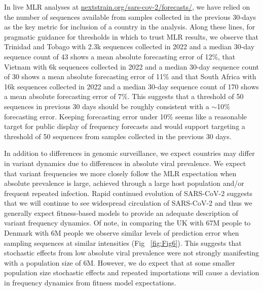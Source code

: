 \documentclass[10pt,letterpaper]{article}
\begin{document}
In live MLR analyses at \href{https://nextstrain.org/sars-cov-2/forecasts/}{nextstrain.org/sars-cov-2/forecasts/}, we have relied on the number of sequences available from samples collected in the previous 30-days as the key metric for inclusion of a country in the analysis.
Along these lines, for pragmatic guidance for thresholds in which to trust MLR results, we observe that Trinidad and Tobago with 2.3k sequences collected in 2022 and a median 30-day sequence count of 43 shows a mean absolute forecasting error of 12\%, that Vietnam with 6k sequences collected in 2022 and a median 30-day sequence count of 30 shows a mean absolute forecasting error of 11\% and that South Africa with 16k sequences collected in 2022 and a median 30-day sequence count of 170 shows a mean absolute forecasting error of 7\%.
This suggests that a threshold of 50 sequences in previous 30 days should be roughly consistent with a $\sim$10\% forecasting error.
Keeping forecasting error under 10\%  seems like a reasonable target for public display of frequency forecasts and would support targeting a threshold of 50 sequences from samples collected in the previous 30 days.

In addition to differences in genomic surveillance, we expect countries may differ in variant dynamics due to differences in absolute viral prevalence.
We expect that variant frequencies we more closely follow the MLR expectation when absolute prevalence is large, achieved through a large host population and/or frequent repeated infection.
Rapid continued evolution of SARS-CoV-2 \cite{kistler2023atlas} suggests that we will continue to see widespread circulation of SARS-CoV-2 and thus we generally expect fitness-based models to provide an adequate description of variant frequency dynamics.
Of note, in comparing the UK with 67M people to Denmark with 6M people we observe similar levels of prediction error when sampling sequences at similar intensities (Fig ~\ref{fig:Fig6}).
This suggests that stochastic effects from low absolute viral prevalence were not strongly manifesting with a population size of 6M.
However, we do expect that at some smaller population size stochastic effects and repeated importations will cause a deviation in frequency dynamics from fitness model expectations.

\end{document}
